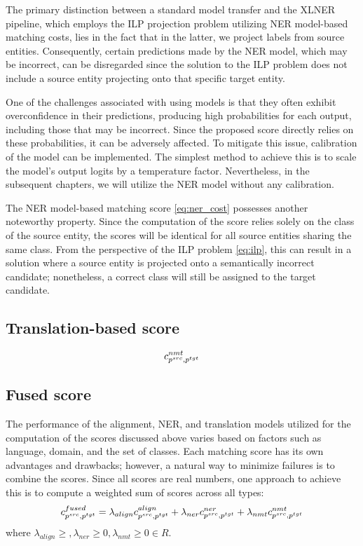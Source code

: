 The primary distinction between a standard model transfer and the XLNER pipeline,
which employs the ILP projection problem utilizing NER model-based matching costs,
lies in the fact that in the latter, we project labels from source entities.
Consequently, certain predictions made by the NER model, which may be incorrect,
can be disregarded since the solution to the ILP problem does not include a
source entity projecting onto that specific target entity.

One of the challenges associated with using models is that they often exhibit
overconfidence in their predictions, producing high probabilities for each output,
including those that may be incorrect. Since the proposed score directly relies on
these probabilities, it can be adversely affected. To mitigate this issue, calibration
of the model can be implemented. The simplest method to achieve this is to scale
the model's output logits by a temperature factor. Nevertheless, in the subsequent chapters,
we will utilize the NER model without any calibration.

The NER model-based matching score \eqref{eq:ner_cost} possesses another noteworthy
property. Since the computation of the score relies solely on the class of the source
entity, the scores will be identical for all source entities sharing the same class.
From the perspective of the ILP problem \eqref{eq:ilp}, this can result in a solution
where a source entity is projected onto a semantically incorrect candidate;
nonetheless, a correct class will still be assigned to the target candidate.

\subsection{Translation-based score}

\begin{equation} \label{eq:nmt_cost}
  c_{p^{src}, p^{tgt}}^{nmt}
\end{equation}

\subsection{Fused score}
The performance of the alignment, NER, and translation models utilized for the
computation of the scores discussed above varies based on factors such as language,
domain, and the set of classes. Each matching score has its own advantages and
drawbacks; however, a natural way to minimize failures is to combine the scores.
Since all scores are real numbers, one approach to achieve this is to compute a
weighted sum of scores across all types:
\begin{equation} \label{eq:fused_cost}
  c_{p^{src}, p^{tgt}}^{fused} =
  \lambda_{align} c_{p^{src}, p^{tgt}}^{align} +
  \lambda_{ner} c_{p^{src}, p^{tgt}}^{ner} +
  \lambda_{nmt} c_{p^{src}, p^{tgt}}^{nmt}
\end{equation}
where \( \lambda_{align} \geq, \lambda_{ner} \geq 0, \lambda_{nmt} \geq 0 \in R\).

